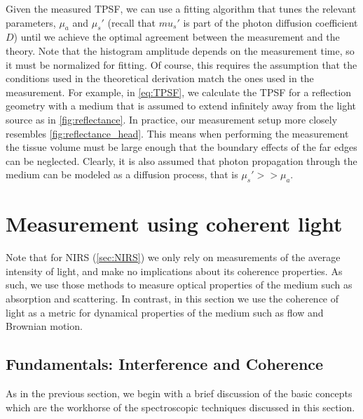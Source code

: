 Given the measured TPSF, we can use a fitting algorithm that tunes the relevant parameters, $\mu_a$ and $\mu_s'$ (recall that $mu_s'$ is part of the photon diffusion coefficient $D$) until we achieve the optimal agreement between the measurement and the theory. Note that the histogram amplitude depends on the measurement time, so it must be normalized for fitting. Of course, this requires the assumption that the conditions used in the theoretical derivation match the ones used in the measurement. For example, in \autoref{eq:TPSF}, we calculate the TPSF for a reflection geometry with a medium that is assumed to extend infinitely away from the light source as in \autoref{fig:reflectance}. In practice, our measurement setup more closely resembles \autoref{fig:reflectance_head}. This means when performing the measurement the tissue volume must be large enough that the boundary effects of the far edges can be neglected. Clearly, it is also assumed that photon propagation through the medium can be modeled as a diffusion process, that is $\mu_s' >> \mu_a$. 


\section{Measurement using coherent light} \label{sec:Coherent}
Note that for NIRS (\autoref{sec:NIRS}) we only rely on measurements of the average intensity of light, and make no implications about its coherence properties. As such, we use those methods to measure optical properties of the medium such as absorption and scattering. In contrast, in this section we use the coherence of light as a metric for dynamical properties of the medium such as flow and Brownian motion.


\subsection{Fundamentals: Interference and Coherence} \label{sec:fundamentals_coherence}

As in the previous section, we begin with a brief discussion of the basic concepts which are the workhorse of the spectroscopic techniques discussed in this section.

